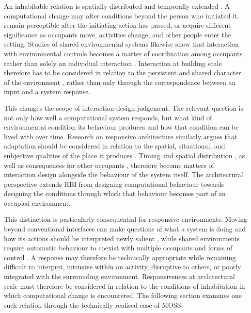 An inhabitable relation is spatially distributed and temporally extended \cite{alavi2018artifacts,nguyen2024adaptive}. A computational change may alter conditions beyond the person who initiated it, remain perceptible after the initiating action has passed, or acquire different significance as occupants move, activities change, and other people enter the setting. Studies of shared environmental systems likewise show that interaction with environmental controls becomes a matter of coordination among occupants rather than solely an individual interaction \cite{niemantsverdriet2018share}. Interaction at building scale therefore has to be considered in relation to the persistent and shared character of the environment \cite{alavi2019introduction, wiberg2020interaction}, rather than only through the correspondence between an input and a system response.

This changes the scope of interaction-design judgement. The relevant question is not only how well a computational system responds, but what kind of environmental condition its behaviour produces and how that condition can be lived with over time. Research on responsive architecture similarly argues that adaptation should be considered in relation to the spatial, situational, and subjective qualities of the place it produces \cite{nguyen2022responsive}. Timing and spatial distribution \cite{nguyen2024adaptive}, as well as consequences for other occupants \cite{niemantsverdriet2018share}, therefore become matters of interaction design alongside the behaviour of the system itself. The architectural perspective extends HBI from designing computational behaviour towards designing the conditions through which that behaviour becomes part of an occupied environment.

This distinction is particularly consequential for responsive environments. Moving beyond conventional interfaces can make questions of what a system is doing and how its actions should be interpreted newly salient \cite{bellotti2002making}, while shared environments require automatic behaviour to coexist with multiple occupants and forms of control \cite{vanDeWerff2019lighting}. A response may therefore be technically appropriate while remaining difficult to interpret, intrusive within an activity, disruptive to others, or poorly integrated with the surrounding environment. Responsiveness at architectural scale must therefore be considered in relation to the conditions of inhabitation in which computational change is encountered. The following section examines one such relation through the technically realised case of MOSS.



